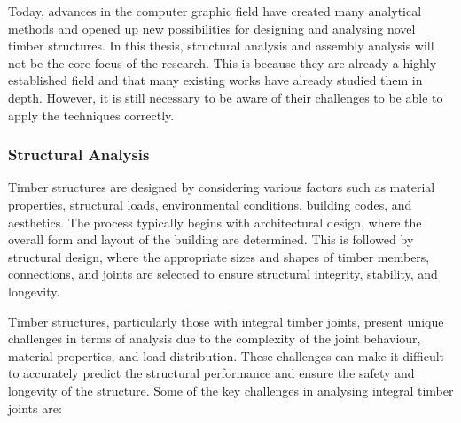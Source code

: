 \documentclass[11pt]{book}
\begin{document}
Today, advances in the computer graphic field have created many analytical methods and opened up new possibilities for designing and analysing novel timber structures. In this thesis, structural analysis and assembly analysis will not be the core focus of the research. This is because they are already a highly established field and that many existing works have already studied them in depth. However, it is still necessary to be aware of their challenges to be able to apply the techniques correctly.

\subsubsection{Structural Analysis}

Timber structures are designed by considering various factors such as material properties, structural loads, environmental conditions, building codes, and aesthetics. The process typically begins with architectural design, where the overall form and layout of the building are determined. This is followed by structural design, where the appropriate sizes and shapes of timber members, connections, and joints are selected to ensure structural integrity, stability, and longevity.

Timber structures, particularly those with integral timber joints, present unique challenges in terms of analysis due to the complexity of the joint behaviour, material properties, and load distribution. These challenges can make it difficult to accurately predict the structural performance and ensure the safety and longevity of the structure. Some of the key challenges in analysing integral timber joints are:
\end{document}
